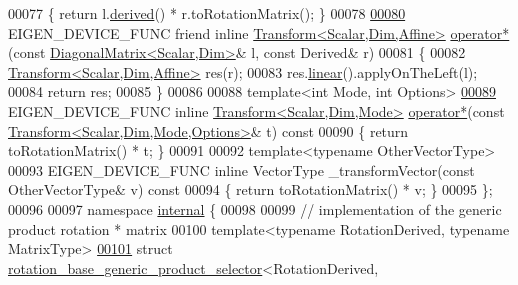 \begin{DoxyCode}
00077     \{ \textcolor{keywordflow}{return} l.\hyperlink{group___core___module_a324b16961a11d2ecfd2d1b7dd7946545}{derived}() * r.toRotationMatrix(); \}
00078 
\hyperlink{class_eigen_1_1_rotation_base_a507ee9474b9d648cdc9d294f4e944d60}{00080}     EIGEN\_DEVICE\_FUNC \textcolor{keyword}{friend} \textcolor{keyword}{inline} \hyperlink{group___geometry___module_class_eigen_1_1_transform}{Transform<Scalar,Dim,Affine>} 
      \hyperlink{class_eigen_1_1_rotation_base_a507ee9474b9d648cdc9d294f4e944d60}{operator*}(\textcolor{keyword}{const} \hyperlink{group___core___module_class_eigen_1_1_diagonal_matrix}{DiagonalMatrix<Scalar,Dim>}& l, \textcolor{keyword}{const} Derived& r)
00081     \{ 
00082       \hyperlink{group___geometry___module_class_eigen_1_1_transform}{Transform<Scalar,Dim,Affine>} res(r);
00083       res.\hyperlink{group___geometry___module_a535bd63d047c2a36585c3f9b62219a1e}{linear}().applyOnTheLeft(l);
00084       \textcolor{keywordflow}{return} res;
00085     \}
00086 
00088     \textcolor{keyword}{template}<\textcolor{keywordtype}{int} Mode, \textcolor{keywordtype}{int} Options>
\hyperlink{class_eigen_1_1_rotation_base_adf1097a616f0ebf7e78eea9598697672}{00089}     EIGEN\_DEVICE\_FUNC \textcolor{keyword}{inline} \hyperlink{group___geometry___module_class_eigen_1_1_transform}{Transform<Scalar,Dim,Mode>} 
      \hyperlink{class_eigen_1_1_rotation_base_adf1097a616f0ebf7e78eea9598697672}{operator*}(\textcolor{keyword}{const} \hyperlink{group___geometry___module_class_eigen_1_1_transform}{Transform<Scalar,Dim,Mode,Options>}& t)\textcolor{keyword}{ const}
00090 \textcolor{keyword}{    }\{ \textcolor{keywordflow}{return} toRotationMatrix() * t; \}
00091 
00092     \textcolor{keyword}{template}<\textcolor{keyword}{typename} OtherVectorType>
00093     EIGEN\_DEVICE\_FUNC \textcolor{keyword}{inline} VectorType \_transformVector(\textcolor{keyword}{const} OtherVectorType& v)\textcolor{keyword}{ const}
00094 \textcolor{keyword}{    }\{ \textcolor{keywordflow}{return} toRotationMatrix() * v; \}
00095 \};
00096 
00097 \textcolor{keyword}{namespace }\hyperlink{namespaceinternal}{internal} \{
00098 
00099 \textcolor{comment}{// implementation of the generic product rotation * matrix}
00100 \textcolor{keyword}{template}<\textcolor{keyword}{typename} RotationDerived, \textcolor{keyword}{typename} MatrixType>
\hyperlink{struct_eigen_1_1internal_1_1rotation__base__generic__product__selector_3_01_rotation_derived_00_01_matrix_type_00_01false_01_4}{00101} \textcolor{keyword}{struct }\hyperlink{struct_eigen_1_1internal_1_1rotation__base__generic__product__selector}{rotation\_base\_generic\_product\_selector}<RotationDerived,

\end{DoxyCode}

